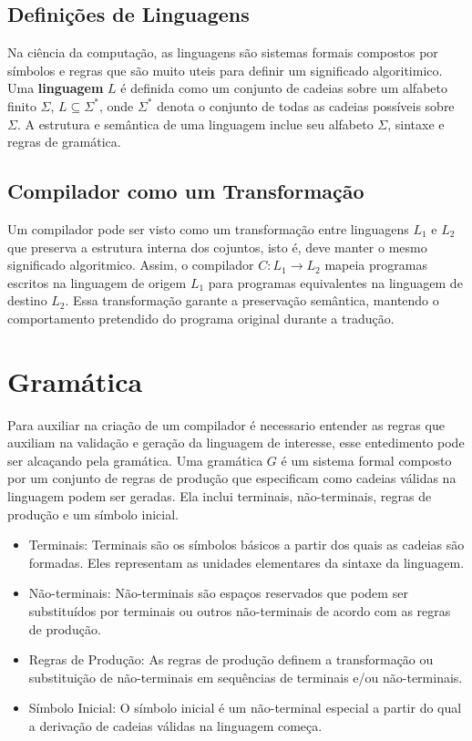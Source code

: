 \documentclass[english, 
               brazil, 
               bsc] %
               {dcomp-abntex2}
\begin{document}
\subsection{Definições de Linguagens}

Na ciência da computação, as linguagens são sistemas formais compostos por símbolos e regras que são muito uteis para definir um significado algoritimico. Uma \textbf{linguagem} $L$ é definida como um conjunto de cadeias sobre um alfabeto finito $ \Sigma $, $ L \subseteq \Sigma^* $, onde  $ \Sigma^* $ denota o conjunto de todas as cadeias possíveis sobre $ \Sigma $. A estrutura e semântica de uma linguagem  inclue seu alfabeto $ \Sigma $, sintaxe e regras de gramática.

\subsection{Compilador como um Transformação}

Um compilador pode ser visto como um transformação entre linguagens $ L_1 $ e $ L_2 $ que preserva a estrutura interna dos cojuntos, isto é, deve manter o mesmo significado algoritmico. Assim, o compilador $ C: L_1 \rightarrow L_2 $ mapeia programas escritos na linguagem de origem $ L_1 $ para programas equivalentes na linguagem de destino $ L_2 $. Essa transformação garante a preservação semântica, mantendo o comportamento pretendido do programa original durante a tradução.


\section{Gramática}

Para auxiliar na criação de um compilador é necessario entender as regras que auxiliam na validação e geração da linguagem de interesse, esse entedimento pode ser alcaçando pela gramática. Uma gramática $ G $ é um sistema formal composto por um conjunto de regras de produção que especificam como cadeias válidas na linguagem podem ser geradas. Ela inclui terminais, não-terminais, regras de produção e um símbolo inicial.

\begin{itemize}
  \item Terminais: Terminais são os símbolos básicos a partir dos quais as cadeias são formadas. Eles representam as unidades elementares da sintaxe da linguagem.
  \item Não-terminais: Não-terminais são espaços reservados que podem ser substituídos por terminais ou outros não-terminais de acordo com as regras de produção.

  \item Regras de Produção: As regras de produção definem a transformação ou substituição de não-terminais em sequências de terminais e/ou não-terminais.

  \item Símbolo Inicial: O símbolo inicial é um não-terminal especial a partir do qual a derivação de cadeias válidas na linguagem começa.
\end{itemize}
\end{document}
